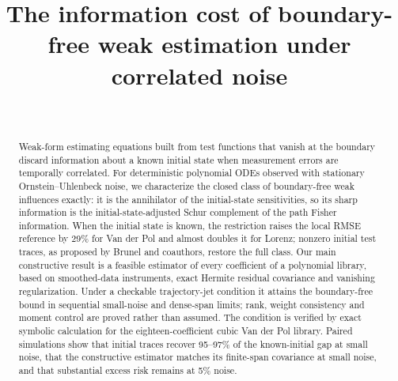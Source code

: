 \documentclass[ejs]{imsart}
\begin{document}
\begin{frontmatter}
\title{The information cost of boundary-free weak estimation under correlated noise}
\begin{aug}
\author[A]{~}
\address[A]{Independent researcher, Almaty, Kazakhstan}
\end{aug}
\begin{abstract}
Weak-form estimating equations built from test functions that vanish at
the boundary discard information about a known initial state when
measurement errors are temporally correlated. For deterministic
polynomial ODEs observed with stationary Ornstein--Uhlenbeck noise, we
characterize the closed class of boundary-free weak influences exactly:
it is the annihilator of the initial-state sensitivities, so its sharp
information is the initial-state-adjusted Schur complement of the path
Fisher information. When the initial state is known, the restriction
raises the local RMSE reference by 29\% for Van der Pol and almost
doubles it for Lorenz; nonzero initial test traces, as proposed by
Brunel and coauthors, restore the full class. Our main constructive
result is a feasible estimator of every coefficient of a polynomial
library, based on smoothed-data instruments, exact Hermite residual
covariance and vanishing regularization. Under a checkable
trajectory-jet condition it attains the boundary-free bound in
sequential small-noise and dense-span limits; rank, weight consistency
and moment control are proved rather than assumed. The condition is
verified by exact symbolic calculation for the eighteen-coefficient
cubic Van der Pol library. Paired simulations show that initial traces
recover 95--97\% of the known-initial gap at small noise, that the
constructive estimator matches its finite-span covariance at small
noise, and that substantial excess risk remains at 5\% noise.

\end{abstract}
\begin{keyword}[class=MSC]
\end{keyword}
\begin{keyword}
\end{keyword}
\end{frontmatter}
\end{document}
